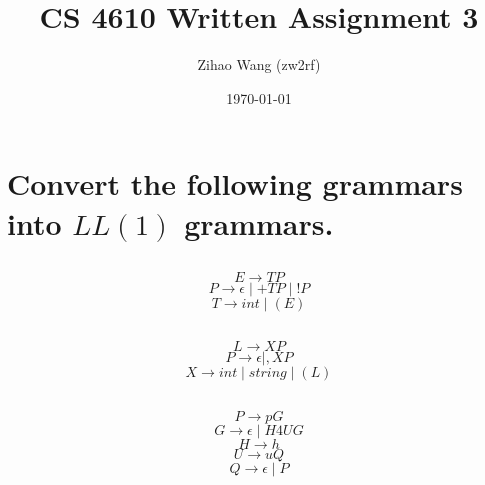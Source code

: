 \documentclass[11pt]{article}
\begin{document}
\thispagestyle{empty}
\title{CS 4610 Written Assignment 3}
\author{Zihao Wang (zw2rf)}
\date{\today}
\maketitle
\doublespacing

\section{Convert the following grammars into $LL(1)$ grammars.}
\subsection{}
$$E \rightarrow TP$$
$$P \rightarrow \epsilon \mid +TP \mid !P$$
$$T \rightarrow int \mid (E)$$

\subsection{}
$$L \rightarrow XP$$
$$P \rightarrow \epsilon \mid ,XP$$
$$X \rightarrow int \mid string \mid (L)$$

\subsection{}
$$P \rightarrow p G$$
$$G \rightarrow \epsilon \mid H 4 U G$$
$$H \rightarrow h$$
$$U \rightarrow uQ$$
$$Q \rightarrow \epsilon \mid P$$
\end{document}
